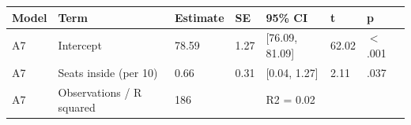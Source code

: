 \begin{tabular}{lllllll}
  \toprule
Model & Term & Estimate & SE & 95\% CI & t & p \\ 
  \midrule
A7 & Intercept & 78.59 & 1.27 & [76.09, 81.09] & 62.02 & $<$ .001 \\ 
  A7 & Seats inside (per 10) & 0.66 & 0.31 & [0.04, 1.27] & 2.11 & .037 \\ 
  A7 & Observations / R squared & 186 &  & R2 = 0.02 &  &  \\ 
   \bottomrule
\end{tabular}
